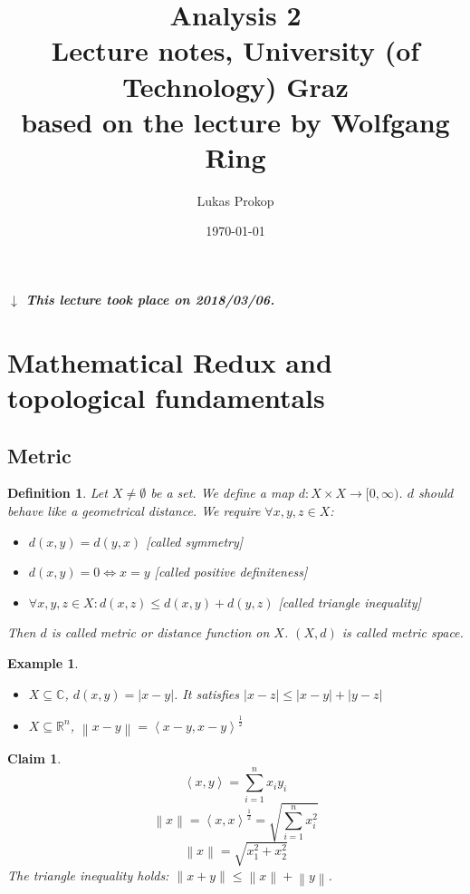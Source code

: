 \documentclass{article}
\title{
  Analysis 2 \\
  \large{Lecture notes, University (of Technology) Graz} \\
  based on the lecture by Wolfgang Ring
}
\date{\today}
\author{Lukas Prokop}
\newtheorem{example}{Example}  \numberwithin{example}{section}
\newtheorem{definition}{Definition}  \numberwithin{definition}{section}
\newtheorem*{claim}{Claim}%
\newcommand{\angel}[1]{\left\langle#1\right\rangle}
\newcommand{\norm}[1]{\left\|#1\right\|}
\newcommand{\card}[1]{\left|#1\right|}
\newcommand{\dateref}[1]{%
  \begin{mdframed}[backgroundcolor=gray!10,innerbottommargin=0pt,innertopmargin=0pt]
    \paragraph{\textit{$\downarrow$ This lecture took place on #1.}}%
  \end{mdframed}%
}
\begin{document}
\maketitle
\tableofcontents

\dateref{2018/03/06}

\section{Mathematical Redux and topological fundamentals}
\subsection{Metric}

\begin{definition}
  Let $X \neq \emptyset$ be a set. We define a map $d: X \times X \to [0,\infty)$.
  $d$ should behave like a geometrical distance. We require $\forall x, y, z \in X$:
  \begin{itemize}
    \item $d(x, y) = d(y, x)$ [called \emph{symmetry}]
    \item $d(x, y) = 0 \iff x = y$ [called \emph{positive definiteness}]
    \item $\forall x,y,z \in X: d(x, z) \leq d(x, y) + d(y, z)$ [called \emph{triangle inequality}]
  \end{itemize}
  Then $d$ is called \emph{metric} or \emph{distance function} on $X$.
  $(X, d)$ is called \emph{metric space}.
\end{definition}

\begin{example}
  \begin{itemize}\hfill{}
    \item $X \subseteq \mathbb C$, $d(x, y) = \card{x - y}$.
          It satisfies $\card{x - z} \leq \card{x - y} + \card{y - z}$
    \item $X \subseteq \mathbb R^n$, $\norm{x - y} = \angel{x - y, x - y}^{\frac12}$
  \end{itemize}
\end{example}

\begin{claim}
  \[ \angel{x, y} = \sum_{i=1}^n x_i y_i \]
  \[ \norm{x} = \angel{x,x}^{\frac12} = \sqrt{\sum_{i=1}^n x_i^2} \]
  \[ \norm{x} = \sqrt{x_1^2 + x_2^2} \]
  The triangle inequality holds: $\norm{x+y} \leq \norm{x} + \norm{y}$.
\end{claim}
\end{document}

